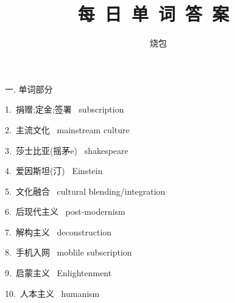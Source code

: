 \documentclass[a4paper, 12pt]{article}
\begin{document}
    \noindent

    \title{ 每\ 日\ 单\ 词\ 答\ 案\  }
    \author{ 烧包 }
    \maketitle

\begin{flushleft}
一. 单词部分
\end{flushleft}

\begin{multicols}{2}
\begin{flushleft}
1.\ 捐赠;定金;签署 \ subscription
\end{flushleft}

\begin{flushleft}
2.\ 主流文化 \ mainstream culture
\end{flushleft}
\end{multicols}

\begin{multicols}{2}
\begin{flushleft}
3.\ 莎士比亚(摇茅e) \ shakespeare
\end{flushleft}

\begin{flushleft}
4.\ 爱因斯坦(汀) \ Einstein
\end{flushleft}
\end{multicols}

\begin{multicols}{2}
\begin{flushleft}
5.\ 文化融合 \ cultural blending/integration
\end{flushleft}

\begin{flushleft}
6.\ 后现代主义 \ post-modernism
\end{flushleft}
\end{multicols}

\begin{multicols}{2}
\begin{flushleft}
7.\ 解构主义 \ deconstruction
\end{flushleft}

\begin{flushleft}
8.\ 手机入网 \ moblile subscription
\end{flushleft}
\end{multicols}

\begin{multicols}{2}
\begin{flushleft}
9.\ 启蒙主义 \ Enlightenment
\end{flushleft}

\begin{flushleft}
10.\ 人本主义 \ humanism
\end{flushleft}
\end{multicols}
\end{document}
